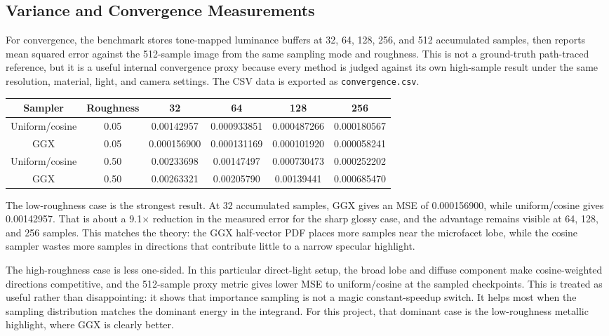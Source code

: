 \documentclass[12pt]{article}
\begin{document}
\subsection{Variance and Convergence Measurements}

For convergence, the benchmark stores tone-mapped luminance buffers at 32, 64, 128, 256, and 512 accumulated samples, then reports mean squared error against the 512-sample image from the same sampling mode and roughness. This is not a ground-truth path-traced reference, but it is a useful internal convergence proxy because every method is judged against its own high-sample result under the same resolution, material, light, and camera settings. The CSV data is exported as \texttt{convergence.csv}.

\begin{center}
\small
\begin{tabular}{|c|c|c|c|c|c|}
\hline
\textbf{Sampler} & \textbf{Roughness} & \textbf{32} & \textbf{64} & \textbf{128} & \textbf{256} \\
\hline
Uniform/cosine & 0.05 & 0.00142957 & 0.000933851 & 0.000487266 & 0.000180567 \\
\hline
GGX & 0.05 & 0.000156900 & 0.000131169 & 0.000101920 & 0.000058241 \\
\hline
Uniform/cosine & 0.50 & 0.00233698 & 0.00147497 & 0.000730473 & 0.000252202 \\
\hline
GGX & 0.50 & 0.00263321 & 0.00205790 & 0.00139441 & 0.000685470 \\
\hline
\end{tabular}
\end{center}

The low-roughness case is the strongest result. At 32 accumulated samples, GGX gives an MSE of 0.000156900, while uniform/cosine gives 0.00142957. That is about a 9.1$\times$ reduction in the measured error for the sharp glossy case, and the advantage remains visible at 64, 128, and 256 samples. This matches the theory: the GGX half-vector PDF places more samples near the microfacet lobe, while the cosine sampler wastes more samples in directions that contribute little to a narrow specular highlight.

The high-roughness case is less one-sided. In this particular direct-light setup, the broad lobe and diffuse component make cosine-weighted directions competitive, and the 512-sample proxy metric gives lower MSE to uniform/cosine at the sampled checkpoints. This is treated as useful rather than disappointing: it shows that importance sampling is not a magic constant-speedup switch. It helps most when the sampling distribution matches the dominant energy in the integrand. For this project, that dominant case is the low-roughness metallic highlight, where GGX is clearly better.
\end{document}
